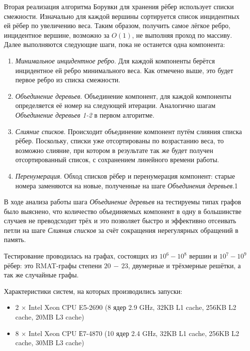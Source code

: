 \documentclass{article}
\begin{document}
Вторая реализация алгоритма Борувки для хранения рёбер использует списки смежности. 
Изначально для каждой вершины сортируется список инцидентных ей рёбер по увеличению веса. 
Таким образом, получить самое лёгкое ребро, инцидентное вершине, возможно за $O(1)$, не выполняя проход по массиву.
Далее выполняются следующие шаги, пока не останется одна компонента:
\begin{enumerate}
    \item \textit{Минимальное инцидентное ребро}.
        Для каждой компоненты берётся инцидентное ей ребро минимального веса. Как отмечено выше, это будет первое ребро из списка смежности.
    \item \textit{Объединение деревьев}.
        Объединение компонент, для каждой компоненты определяется её номер на следующей итерации. 
        Аналогично шагам \textit{Объединение деревьев 1-2} в первом алгоритме.
    \item \textit{Слияние списков}.
        Происходит объединение компонент путём слияния списка рёбер. 
        Поскольку, списки уже отсортированы по возрастанию веса, то возможно слияние, при котором в результате так же будет получен отсортированный список, с сохранением линейного времени работы.
    \item \textit{Перенумерация}.
        Обход списков рёбер и перенумерация компонент: старые номера заменяются на новые, полученные на шаге \textit{Объединения деревьев}.1
\end{enumerate}

В ходе анализа работы шага \textit{Объединение деревьев} на тестируемы типах графов было выяснено, что количество объединяемых компонент в одну в большинстве случаев не преводсходит трёх и это позволяет быстро и эффективно отсеивать петли на шаге \textit{Слияния списков} за счёт сокращения нерегулярных обращений в память.

Тестирование проводилась на графах, состоящих из $10^6-10^8$ вершин и $10^7-10^9$ рёбер: это RMAT-графы степени $20\,-\,23$, двумерные и трёхмерные решётки, а так же случайные графы.

Характеристики систем, на которых производились запуски:
\begin{itemize}
    \item 2 $\times$ Intel Xeon CPU E5-2690 (8 ядер 2.9 GHz, 32KB L1 cache, 256KB L2 cache, 20MB L3 cache)
    \item 8 $\times$ Intel Xeon CPU Е7-4870 (10 ядер 2.4 GHz, 32KB L1 cache, 256KB L2 cache, 30MB L3 cache)
\end{itemize}




\end{document}
